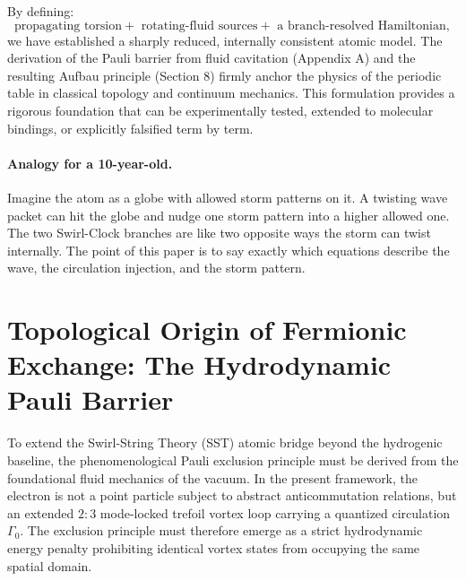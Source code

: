 \documentclass[11pt,a4paper]{article}
\begin{document}
By defining:
\begin{equation}
\boxed{
\text{propagating torsion}
+\text{ rotating-fluid sources}
+\text{ a branch-resolved Hamiltonian},
}
\end{equation}
we have established a sharply reduced, internally consistent atomic model. The derivation of the Pauli barrier from fluid cavitation (Appendix A) and the resulting Aufbau principle (Section 8) firmly anchor the physics of the periodic table in classical topology and continuum mechanics. This formulation provides a rigorous foundation that can be experimentally tested, extended to molecular bindings, or explicitly falsified term by term.

\paragraph{Analogy for a 10-year-old.} Imagine the atom as a globe with allowed storm patterns on it. A twisting wave packet can hit the globe and nudge one storm pattern into a higher allowed one. The two Swirl-Clock branches are like two opposite ways the storm can twist internally. The point of this paper is to say exactly which equations describe the wave, the circulation injection, and the storm pattern.

\appendix
\section{Topological Origin of Fermionic Exchange: The Hydrodynamic Pauli Barrier}
\label{app:PauliBarrier}

To extend the Swirl-String Theory (SST) atomic bridge beyond the hydrogenic baseline, the phenomenological Pauli exclusion principle must be derived from the foundational fluid mechanics of the vacuum. In the present framework, the electron is not a point particle subject to abstract anticommutation relations, but an extended $2{:}3$ mode-locked trefoil vortex loop carrying a quantized circulation $\Gamma_0$. The exclusion principle must therefore emerge as a strict hydrodynamic energy penalty prohibiting identical vortex states from occupying the same spatial domain.
\end{document}
